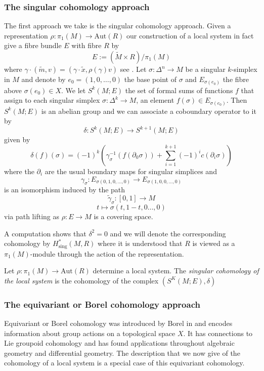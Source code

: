 \subsubsection{The singular cohomology approach}
The first approach we take is the singular cohomology approach. Given a
representation $\rho: \pi_1(M) \to \text{Aut}(R)$ our construction of a local
system in fact give a fibre bundle $E$ with fibre $R$ by $$ E:= (\tilde{M}
    \times R)/\pi_1(M) $$ where $\gamma \cdot (\tilde{m}, v) = (\gamma \cdot
    \tilde{x}, \rho(\gamma)v)$ see \cite{Davis2001LectureNI}. Let $\sigma: \Delta^n
    \to M$ be a singular $k$-simplex in $M$ and denote by $e_0 = (1, 0, \dots , 0)$
the base point of $\sigma$ and $E_{\sigma(e_0)}$ the fibre above $\sigma(e_0)
    \in X$. We let $S^k(M; E)$ the set of formal sums of functions $f$ that assign
to each singular simplex $\sigma: \Delta^k \to M$, an element $f(\sigma) \in
    E_{\sigma(e_0)}$. Then $S^k(M; E)$ is an abelian group and we can associate a
coboundary operator to it by $$ \delta : S^k(M;E) \to S^{k+1}(M;E) $$ given by
$$\delta(f)(\sigma) = (-1)^k \left(\gamma_{\sigma}^{-1}(f(\partial_0 \sigma)) +
    \sum_{i=1}^{k+1}(-1)^ic(\partial_i \sigma)\right)$$ where the $\partial_i$ are
the usual boundary maps for singular simplices and $$ \gamma_{\sigma}:
    E_{\sigma(0,1,0,\dots , 0)} \to E_{\sigma(1,0,0,\dots , 0)} $$ is an
isomorphism induced by the path $$\tilde{\gamma}_{\sigma}: [0,1] \to M$$ $$ t
    \mapsto \sigma(t, 1-t, 0 \dots , 0)$$ via path lifting as $\rho: E \to M$ is a
covering space.

A computation shows that $\delta^2=0$ and we will denote the corresponding
cohomology by $H_{\text{sing}}^*(M, R)$ where it is understood that $R$ is
viewed as a $\pi_1(M)$-module through the action of the representation.

\begin{definition}\label{def:singular-coho-localsystem}
    Let $\rho:\pi_1(M) \to \text{Aut}(R)$ determine a local system. The \emph{singular cohomology of the local system} is the cohomology of the complex $(S^K(M;E), \delta)$
\end{definition}

\subsubsection{The equivariant or Borel cohomology approach}
Equivariant or Borel cohomology was introduced by Borel in \cite{Borel} and
encodes information about group actions on a topological space $X$. It has
connections to Lie groupoid cohomology and has found applications throughout
algebraic geometry and differential geometry. The description that we now give
of the cohomology of a local system is a special case of this equivariant
cohomology.


